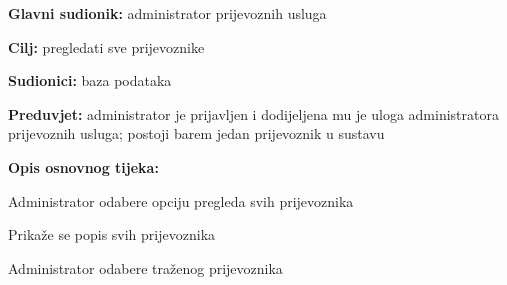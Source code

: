                         \noindent {}
					\begin{packed_item}
	
						\item \textbf{Glavni sudionik: }administrator prijevoznih usluga
						\item  \textbf{Cilj:} pregledati sve prijevoznike
						\item  \textbf{Sudionici:} baza podataka
						\item  \textbf{Preduvjet:} administrator je prijavljen i dodijeljena mu je uloga administratora prijevoznih usluga; postoji barem jedan prijevoznik u sustavu
						\item  \textbf{Opis osnovnog tijeka:}
						
						\item[] \begin{packed_enum}
	
							\item Administrator odabere opciju pregleda svih prijevoznika
							\item Prikaže se popis svih prijevoznika
							\item Administrator odabere traženog prijevoznika
       
						\end{packed_enum}
						
					\end{packed_item}


